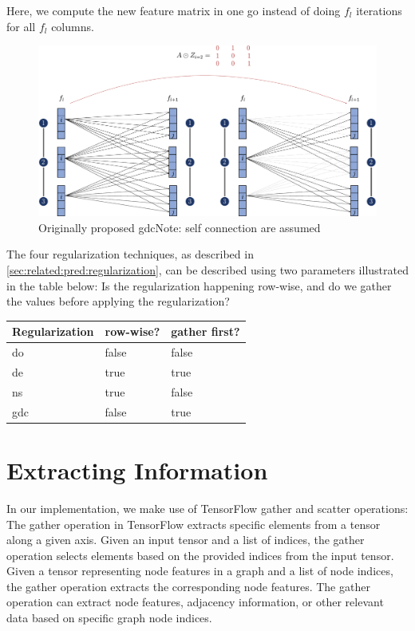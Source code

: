Here, we compute the new feature matrix in one go instead of doing $f_{l}$ iterations for all $f_{l}$ columns.
\begin{figure}[ht]
    \centering
    \includegraphics[width= 0.90\linewidth]{gfx/implementation/GDC-eq5.pdf}
    \caption{Originally proposed \ac{gdc}Note: self connection are assumed}\label{fig:implementaion:GDC-eq5}
\end{figure}




The four regularization techniques, as described in \ref{sec:related:pred:regularization}, can be described using two parameters illustrated in the table below: Is the regularization happening row-wise, and do we gather the values before applying the regularization?
\begin{center}
    \begin{tabular}{lll}
        \toprule
        \textbf{Regularization} & \textbf{row-wise?} & \textbf{gather first?} \\
        \midrule
        \acf{do}                & false              & false                  \\
        \acf{de}                & true               & true                   \\
        \acf{ns}                & true               & false                  \\
        \acf{gdc}               & false              & true                   \\

        \bottomrule
    \end{tabular}
\end{center}
\section{Extracting Information}
In our implementation, we make use of TensorFlow gather and scatter operations:
The gather operation in TensorFlow extracts specific elements from a tensor along a given axis. Given an input tensor and a list of indices, the gather operation selects elements based on the provided indices from the input tensor. Given a tensor representing node features in a graph and a list of node indices, the gather operation extracts the corresponding node features. The gather operation can extract node features, adjacency information, or other relevant data based on specific graph node indices.

